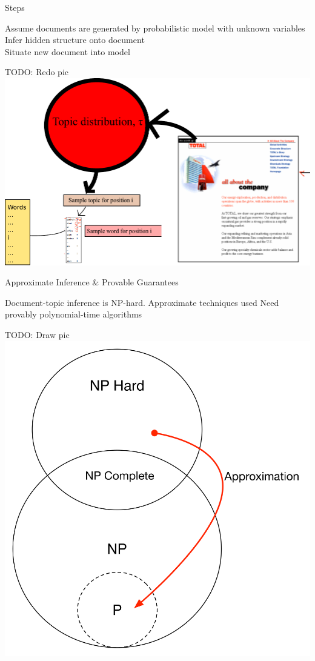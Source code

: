 \documentclass{lecture}
\begin{document}
\begin{plain}{Steps}
\begin{itemize}
	\p Assume documents are generated by probabilistic model with unknown variables\\
	\p Infer hidden structure onto document\\
	\p Situate new document into model\\
\end{itemize}
TODO: Redo pic
\includegraphics[scale=0.4]{figs/steps}
\end{plain}

\begin{plain}{Approximate Inference \& Provable Guarantees}
\begin{itemize}
	\p Document-topic inference is NP-hard.
	\p Approximate techniques used
	\p Need provably polynomial-time algorithms
\end{itemize}
TODO: Draw pic
\includegraphics{figs/np_approx}
\end{plain}
\end{document}
